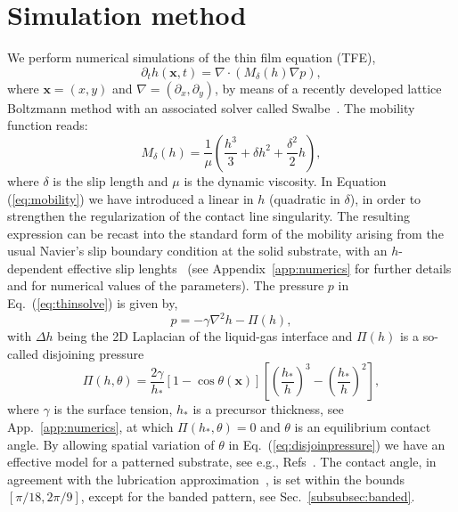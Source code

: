 \documentclass[%
 aip,
 amsmath,amssymb,
 reprint,%
]{revtex4-1}
\begin{document}
\section{Simulation method}
\label{sec:method}
We perform numerical simulations of the thin film equation (TFE),  
\begin{equation}\label{eq:thinsolve}
     \partial_t h(\mathbf{x},t) = \nabla\cdot\left(M_{\delta}(h)\nabla p\right),
\end{equation}
where $\mathbf{x} = (x,y)$ and $\nabla = (\partial_x, \partial_y)$, by means of a recently developed lattice Boltzmann method with an associated solver called Swalbe~\cite{zitzLatticeBoltzmannMethod2019, zitzLatticeBoltzmannSimulations2021, zitzSwalbeJlLattice2022, zitzControllingDewettingMorphologies2023}. 
The mobility function reads:
\begin{equation}\label{eq:mobility}
    M_{\delta}(h) = \frac{1}{\mu}\left(\frac{h^3}{3} + \delta h^2 +\frac{\delta^2}{2} h\right),
\end{equation}
where $\delta$ is the slip length and $\mu$ is the dynamic viscosity. 
In Equation (\ref{eq:mobility}) we have introduced a linear in $h$ (quadratic in $\delta$), in order to strengthen the regularization of the contact line singularity.  
The resulting expression can be recast into the standard form of the mobility arising from the usual Navier's slip boundary condition at the solid substrate, with an $h$-dependent effective slip lenghts~\cite{Haley_Miksis_1991,Greenspan1978} (see Appendix~\ref{app:numerics} for further details and for numerical values of the parameters).
The pressure $p$ in Eq.~(\ref{eq:thinsolve}) is given by,
\begin{equation}\label{eq:filmpressure}
    p = - \gamma\nabla^2 h -\Pi(h),
\end{equation}
with $\Delta h$ being the 2D Laplacian of the liquid-gas interface and $\Pi(h)$ is a so-called disjoining pressure~\cite{schwartzSimulationDropletMotion1998, crasterDynamicsStabilityThin2009, nguyenCompetitionCollapseBreakup2012, gonzalezStabilityLiquidRing2013}
\begin{equation}\label{eq:disjoinpressure}
    \Pi(h,\theta) = \frac{2\gamma}{h_{\ast}}[1-\cos\theta(\mathbf{x})]\left[\left(\frac{h_*}{h}\right)^3 -\left(\frac{h_*}{h}\right)^2\right],
\end{equation}
where $\gamma$ is the surface tension, $h_{\ast}$ is a precursor thickness, see App.~\ref{app:numerics}, at which $\Pi(h_{\ast}, \theta) = 0$ and $\theta$ is an equilibrium contact angle.
By allowing spatial variation of $\theta$ in Eq.~(\ref{eq:disjoinpressure}) we have an effective model for a patterned substrate, see e.g., Refs~\cite{zitzLatticeBoltzmannSimulations2021, zitzControllingDewettingMorphologies2023}. 
The contact angle, in agreement with the lubrication approximation~\cite{oronLongscaleEvolutionThin1997, crasterDynamicsStabilityThin2009}, is set within the bounds $[\pi/18, 2\pi/9]$, except for the banded pattern, see Sec.~\ref{subsubsec:banded}.
\end{document}
